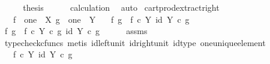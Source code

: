 \begin{isabellebody}
\ \ \isamarkupfalse%
\ \isamarkupfalse%
\ {\isacharquery}{\kern0pt}thesis\isanewline
\ \ \ \ \isamarkupfalse%
\ calculation\ \isamarkupfalse%
\ auto\isanewline
{}\isamarkupfalse%
%
\endisatagproof
{\isafoldproof}%
%
\isadelimproof
\isanewline
%
\endisadelimproof
\isanewline
{}\isamarkupfalse%
\ cart{\isacharunderscore}{\kern0pt}prod{\isacharunderscore}{\kern0pt}extract{\isacharunderscore}{\kern0pt}right{\isacharcolon}{\kern0pt}\isanewline
\ \ \ {\isachardoublequoteopen}f\ {\isacharcolon}{\kern0pt}\ one\ {\isasymrightarrow}\ X{\isachardoublequoteclose}\ {\isachardoublequoteopen}g\ {\isacharcolon}{\kern0pt}\ one\ {\isasymrightarrow}\ Y{\isachardoublequoteclose}\isanewline
\ \ \ {\isachardoublequoteopen}{\isasymlangle}f{\isacharcomma}{\kern0pt}\ g{\isasymrangle}\ {\isacharequal}{\kern0pt}\ {\isasymlangle}f\ {\isasymcirc}\isactrlsub c\ {\isasymbeta}\isactrlbsub Y\isactrlesub {\isacharcomma}{\kern0pt}\ id\ Y{\isasymrangle}\ {\isasymcirc}\isactrlsub c\ g{\isachardoublequoteclose}\isanewline
%
\isadelimproof
%
\endisadelimproof
%
\isatagproof
{}\isamarkupfalse%
\ {\isacharminus}{\kern0pt}\isanewline
\ \ \isamarkupfalse%
\ {\isachardoublequoteopen}{\isasymlangle}f{\isacharcomma}{\kern0pt}\ g{\isasymrangle}\ {\isacharequal}{\kern0pt}\ {\isasymlangle}f\ {\isasymcirc}\isactrlsub c\ {\isasymbeta}\isactrlbsub Y\isactrlesub \ {\isasymcirc}\isactrlsub c\ g{\isacharcomma}{\kern0pt}\ id\ Y\ {\isasymcirc}\isactrlsub c\ g{\isasymrangle}{\isachardoublequoteclose}\isanewline
\ \ \ \ \isamarkupfalse%
\ assms\ \isamarkupfalse%
\ {\isacharparenleft}{\kern0pt}typecheck{\isacharunderscore}{\kern0pt}cfuncs{\isacharcomma}{\kern0pt}\ metis\ id{\isacharunderscore}{\kern0pt}left{\isacharunderscore}{\kern0pt}unit{}\ id{\isacharunderscore}{\kern0pt}right{\isacharunderscore}{\kern0pt}unit{}\ id{\isacharunderscore}{\kern0pt}type\ one{\isacharunderscore}{\kern0pt}unique{\isacharunderscore}{\kern0pt}element{\isacharparenright}{\kern0pt}\isanewline
\ \ \isamarkupfalse%
\ \isamarkupfalse%
\ {\isachardoublequoteopen}{\isachardot}{\kern0pt}{\isachardot}{\kern0pt}{\isachardot}{\kern0pt}\ {\isacharequal}{\kern0pt}\ {\isasymlangle}f\ {\isasymcirc}\isactrlsub c\ {\isasymbeta}\isactrlbsub Y\isactrlesub {\isacharcomma}{\kern0pt}\ id\ Y{\isasymrangle}\ {\isasymcirc}\isactrlsub c\ g{\isachardoublequoteclose}\isanewline
\ \ \ \ \isamarkupfalse%

\end{isabellebody}

